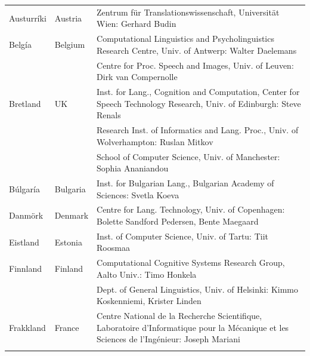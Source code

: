 \documentclass{../../metanetpaper}
\begin{document}
\cleardoublepage

\appendix
{}



  
\cleardoublepage

\label{metanetmembers}

\small
\begin{longtable}{llp{105mm}}
  Austurríki & \textcolor{grey1}{Austria} & Zentrum für Translationswissenschaft, Universität Wien: Gerhard Budin\\ \addlinespace 
  Belgía & \textcolor{grey1}{Belgium} & Computational Linguistics and Psycholinguistics Research Centre, Univ. of Antwerp: Walter Daelemans\\ \addlinespace
  & & Centre for Proc. Speech and Images, Univ. of Leuven: Dirk van Compernolle \\ \addlinespace
  Bretland & \textcolor{grey1}{UK} & Inst. for Lang., Cognition and Computation, Center for Speech Technology Research, Univ. of Edinburgh: Steve Renals \\ \addlinespace 
  & & Research Inst. of Informatics and Lang. Proc., Univ. of Wolverhampton: Ruslan Mitkov \\ \addlinespace 
  & & School of Computer Science, Univ. of Manchester: Sophia Ananiandou \\ \addlinespace 
  Búlgaría & \textcolor{grey1}{Bulgaria} & Inst. for Bulgarian Lang., Bulgarian Academy of Sciences: Svetla Koeva \\ \addlinespace
  Danmörk &  \textcolor{grey1}{Denmark} & Centre for Lang. Technology, Univ. of Copenhagen: Bolette Sandford Pedersen, Bente Maegaard\\ \addlinespace
  Eistland & \textcolor{grey1}{Estonia} & Inst. of Computer Science, Univ. of Tartu: Tiit Roosmaa\\ \addlinespace
  Finnland & \textcolor{grey1}{Finland} & Computational Cognitive Systems Research Group, Aalto Univ.: Timo Honkela\\ \addlinespace
  & & Dept. of General Linguistics, Univ. of Helsinki: Kimmo Koskenniemi, Krister Linden \\ \addlinespace
  Frakkland & \textcolor{grey1}{France} & Centre National de la Recherche Scientifique, Laboratoire d'Informatique pour la Mécanique et les Sciences de l'Ingénieur: Joseph Mariani \\ \addlinespace

\end{longtable}
\end{document}
